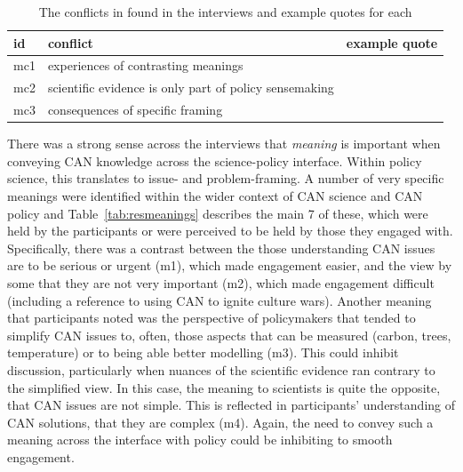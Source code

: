 
\begin{table}[!ht]
\footnotesize
\caption{The conflicts in \ismsm{} found in the interviews and example quotes for each}\label{tab:resmeaningsconf}
\begin{tabular}{L{.06\linewidth}L{.3\linewidth}L{.64\linewidth}} \hline
\textbf{id} & \textbf{conflict} & \textbf{example quote} \\ \hline \hline 
mc1 & experiences of contrasting meanings &  \\[5mm]
mc2 & scientific evidence is only part of policy sensemaking &  \\[5mm]
mc3 & consequences of specific framing &  \\[5mm] \hline
\end{tabular}
\end{table}


There was a strong sense across the interviews that \emph{meaning} is important when conveying CAN knowledge across the science-policy interface. Within policy science, this translates to issue- and problem-framing. A number of very specific meanings were identified within the wider context of CAN science and CAN policy and Table~\ref{tab:resmeanings} describes the main 7 of these, which were held by the participants or were perceived to be held by those they engaged with. Specifically, there was a contrast between the those understanding CAN issues are to be serious or urgent (m1), which made engagement easier, and the view by some that they are not very important (m2), which made engagement difficult (including a reference to using CAN to ignite culture wars). Another meaning that participants noted was the perspective of policymakers that tended to simplify CAN issues to, often, those aspects that can be measured (carbon, trees, temperature) or to being able better modelling (m3). This could inhibit discussion, particularly when nuances of the scientific evidence ran contrary to the simplified view. In this case, the meaning to scientists is quite the opposite, that CAN issues are not simple. This is reflected in participants' understanding of CAN solutions, that they are complex (m4). Again, the need to convey such a meaning across the interface with policy could be inhibiting to smooth engagement. 

